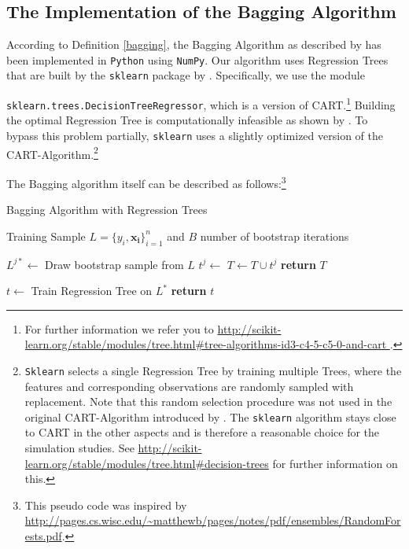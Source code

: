 \subsection{The Implementation of the Bagging Algorithm}\label{sec:Sim_Impl_App}
According to Definition \ref{bagging}, the Bagging Algorithm as described by \cite{Breiman1996} has been implemented in \texttt{Python} using \texttt{NumPy}. Our algorithm uses Regression Trees that are \hfill built \hfill by \hfill the \hfill \texttt{sklearn} \hfill package \hfill by \hfill \cite{scikit-learn2011}. \hfill Specifically, \hfill we \hfill use \hfill the \hfill module

\texttt{sklearn.trees.DecisionTreeRegressor}, which is a version of CART.\footnote{For further information we refer you to \url{http://scikit-learn.org/stable/modules/tree.html\#tree-algorithms-id3-c4-5-c5-0-and-cart }.} Building the optimal Regression Tree is computationally infeasible as shown by \cite{Hyafil1976}. To bypass this problem partially, \texttt{sklearn} uses a slightly optimized version of the CART-Algorithm.\footnote{\texttt{Sklearn} selects a single Regression Tree by training multiple Trees, where the features and corresponding observations are randomly sampled with replacement. Note that this random selection procedure was not used in the original CART-Algorithm introduced by \cite{Breiman1984}. The \texttt{sklearn} algorithm stays close to CART in the other aspects and is therefore a reasonable choice for the simulation studies. See \url{http://scikit-learn.org/stable/modules/tree.html\#decision-trees} for further information on this.}

The Bagging algorithm itself can be described as follows:\footnote{This pseudo code was inspired by \url{http://pages.cs.wisc.edu/~matthewb/pages/notes/pdf/ensembles/RandomForests.pdf}.}

\begin{algorithm}
    \caption{Bagging Algorithm with Regression Trees}
    \label{fit-bagging}
    \begin{algorithmic}[1] %
      \Require Training Sample $L = \{y_{i},\mathbf{x_{i}} \}_{i=1}^{n}$ and $B$ number of bootstrap iterations

             
                \State $L^{j*} \gets $ Draw bootstrap sample from $L$
                \State $t^j \gets$ 
                \State $T \gets T \cup t^j$
            \EndFor
            \State \textbf{return} $T$
        \EndFunction

        \State $t \gets$ Train Regression Tree on $L^*$
        \State \textbf{return} $t$
        \EndFunction
    \end{algorithmic}
\end{algorithm}

